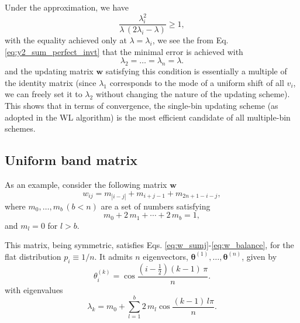 \documentclass[reprint]{revtex4-1}
\begin{document}
Under the approximation, we have
$$
\frac{ \lambda_i^2 }{ \lambda \, (2 \lambda_i - \lambda) } \ge 1,
$$
with the equality achieved only at $\lambda = \lambda_i$,
we see the from Eq. \eqref{eq:y2_sum_perfect_invt}
that the minimal error is achieved with
\begin{equation}
  \lambda_2 = \dots = \lambda_n = \lambda.
\end{equation}
%
and the updating matrix $\mathbf w$ satisfying this condition
is essentially a multiple of the identity matrix
(since $\lambda_1$ corresponds to the mode
of a uniform shift of all $v_i$,
we can freely set it to $\lambda_2$
without changing the nature of the updating scheme).
%
This shows that in terms of convergence,
the single-bin updating scheme
(as adopted in the WL algorithm)
is the most efficient candidate
of all multiple-bin schemes.



\subsection{Uniform band matrix}



As an example, consider the following matrix $\mathbf w$
%
\begin{equation}
  w_{ij} = m_{|i-j|} + m_{i+j-1} + m_{2n+1-i-j},
  \label{eq:w_band}
\end{equation}
%
where $m_0, \dots, m_b \, (b < n)$
are a set of numbers satisfying
%
\begin{equation}
m_0 + 2 \, m_1 + \cdots + 2 \, m_b = 1,
\label{eq:m_normalization}
\end{equation}
%
and $m_l = 0$ for $l > b$.


This matrix, being symmetric,
satisfies Eqs. \eqref{eq:w_sumj}-\eqref{eq:w_balance},
for the flat distribution $p_i \equiv 1/n$.
%
It admits $n$ eigenvectors,
$\pmb\theta^{(1)}, \dots, \pmb\theta^{(n)}$,
given by
%
\begin{equation}
\theta^{(k)}_i
= \cos \frac{ \left(i - \frac12\right) (k - 1) \, \pi}{n}.
\label{eq:wband_eigenvector}
\end{equation}
%
with eigenvalues
\begin{equation}
  \lambda_k = m_0 + \sum_{l = 1}^b 2 \, m_l \cos \frac{(k - 1)  \, l \pi}{n}.
\label{eq:wband_eigenvalue}
\end{equation}
\end{document}
